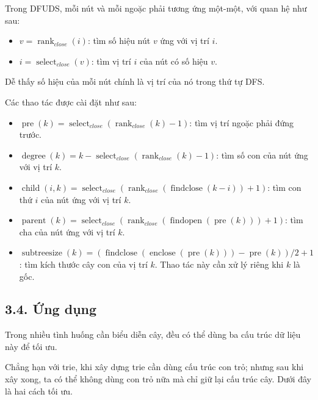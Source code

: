 \documentclass[11pt]{article}
\DeclareMathOperator{\rank}{rank}
\begin{document}
Trong DFUDS, mỗi nút và mỗi ngoặc phải tương ứng một-một, với quan hệ như sau:

\begin{itemize}
  \item \(v=\rank_{\mathit{close}}(i)\): tìm số hiệu nút \(v\) ứng với vị trí
        \(i\).
  \item \(i=\operatorname{select}_{\mathit{close}}(v)\): tìm vị trí \(i\) của
        nút có số hiệu \(v\).
\end{itemize}

Dễ thấy số hiệu của mỗi nút chính là vị trí của nó trong thứ tự DFS.

Các thao tác được cài đặt như sau:

\begin{itemize}
  \item \(\operatorname{pre}(k)=
        \operatorname{select}_{\mathit{close}}(\rank_{\mathit{close}}(k)-1)\):
        tìm vị trí ngoặc phải đứng trước.
  \item \(\operatorname{degree}(k)=
        k-\operatorname{select}_{\mathit{close}}(\rank_{\mathit{close}}(k)-1)\):
        tìm số con của nút ứng với vị trí \(k\).
  \item \(\operatorname{child}(i,k)=
        \operatorname{select}_{\mathit{close}}(
        \rank_{\mathit{close}}(\operatorname{findclose}(k-i))+1)\): tìm con
        thứ \(i\) của nút ứng với vị trí \(k\).
  \item \(\operatorname{parent}(k)=
        \operatorname{select}_{\mathit{close}}(
        \rank_{\mathit{close}}(\operatorname{findopen}(\operatorname{pre}(k)))+1)\):
        tìm cha của nút ứng với vị trí \(k\).
  \item \(\operatorname{subtreesize}(k)=
        (\operatorname{findclose}(\operatorname{enclose}(\operatorname{pre}(k)))
        -\operatorname{pre}(k))/2+1\): tìm kích thước cây con của vị trí
        \(k\). Thao tác này cần xử lý riêng khi \(k\) là gốc.
\end{itemize}

\subsection*{3.4. Ứng dụng}

Trong nhiều tình huống cần biểu diễn cây, đều có thể dùng ba cấu trúc dữ liệu
này để tối ưu.

Chẳng hạn với trie, khi xây dựng trie cần dùng cấu trúc con trỏ; nhưng sau khi
xây xong, ta có thể không dùng con trỏ nữa mà chỉ giữ lại cấu trúc cây. Dưới
đây là hai cách tối ưu.
\end{document}
